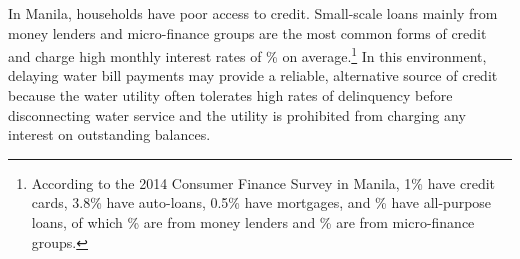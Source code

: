 \documentclass[12pt,table]{article}
\begin{document}

In Manila, households have poor access to credit.  Small-scale loans mainly from money lenders and micro-finance groups are the most common forms of credit and charge high monthly interest rates of \unskip\% on average.\footnote{According to the 2014 Consumer Finance Survey in Manila, 1\% have credit cards, 3.8\% have auto-loans, 0.5\% have mortgages, and \unskip\% have all-purpose loans, of which \unskip\% are from money lenders and \unskip\% are from micro-finance groups.}  In this environment, delaying water bill payments may provide a reliable, alternative source of credit because the water utility often tolerates high rates of delinquency before disconnecting water service and the utility is prohibited from charging any interest on outstanding balances.  
\end{document}
